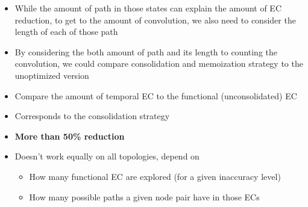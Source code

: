 \begin{itemize}
    \item While the amount of path in those states can explain the amount of EC reduction, to get to 
        the amount of convolution, we also need to consider the length of each of those path
    \item By considering the both amount of path and its length to counting the convolution, we could 
        compare consolidation and memoization strategy to the unoptimized version
\end{itemize}

\begin{itemize}
    \item Compare the amount of temporal EC to the functional (unconsolidated) EC
    \item Corresponds to the consolidation strategy
    \item \textbf{More than 50\% reduction}
    \item Doesn't work equally on all topologies, depend on 
    \begin{itemize}
        \item How many functional EC are explored (for a given inaccuracy level)
        \item How many possible paths a given node pair have in those ECs
    \end{itemize}
\end{itemize}


